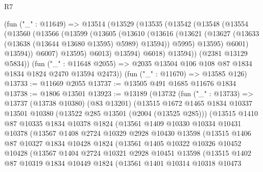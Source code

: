 \begin{lexlean}{R7}
\begin{coremodule}
      (fun ("_" : @11649) =>
      @13514
        (@13529
          (@13535
            (@13542
              (@13548
                (@13554
                  (@13560
                    (@13566
                      (@13599
                        (@13605
                          (@13610
                            (@13616
                              (@13621
                                (@13627 (@13633 (@13638 (@13644 @13680 @13595) @5989) @13594))
                                @5995)
                              @13595)
                            @6001)
                          @13594))
                      @6007)
                    @13595)
                  @6013)
                @13594)
              @6018)
            @13594))
        (@2381 @13129 @5834))
      (fun ("_" : @11648 @2055) => @2035 @13504 @106 @108 @87 @1834 @1834 @1824 @2470 @13594 @2473))
    (fun ("_" : @11670) => @13585 @126)
@13733 := @11669 @2055
@13737 := @13505 @491 @1685 @11676 @1834
@13738 := @1806 @13501
@13923 := @13189
    (@13732
      (fun ("_" : @13733) =>
      @13737
        (@13738 @10380)
        (@83 @13201)
        (@13515
          @1672
          @1465
          @1834
          @10337
          @13501
          @10380
          (@13522 @285 @13501 (@2004 (@13525 @285)))
          (@13515
            @1410
            @87
            @10335
            @1834
            @10378
            @1824
            (@13561
              @1409
              @10330
              @10334
              @10431
              @10378
              (@13567
                @1408
                @2724
                @10329
                @2928
                @10430
                @13598
                (@13515
                  @1406
                  @87
                  @10327
                  @1834
                  @10428
                  @1824
                  (@13561
                    @1405
                    @10322
                    @10326
                    @10452
                    @10428
                    (@13567
                      @1404
                      @2724
                      @10321
                      @2928
                      @10451
                      @13598
                      (@13515
                        @1402
                        @87
                        @10319
                        @1834
                        @10449
                        @1824
                        (@13561
                          @1401
                          @10314
                          @10318
                          @10473

\end{coremodule}
\end{lexlean}
